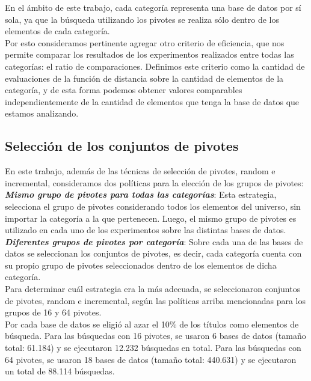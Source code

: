 En el \'ambito de este trabajo, cada categor\'ia representa una base de datos por s\'i sola, ya que la b\'usqueda utilizando los pivotes se realiza s\'olo dentro de los elementos de cada categor\'ia.\\

Por esto consideramos pertinente agregar otro criterio de eficiencia, que nos permite comparar los resultados de los experimentos realizados entre todas las categor\'ias: el ratio de comparaciones. Definimos este criterio como la cantidad de evaluaciones de la funci\'on de distancia sobre la cantidad de elementos de la categor\'ia, y de esta forma podemos obtener valores comparables independientemente de la cantidad de elementos que tenga la base de datos que estamos analizando.

\subsection{Selecci\'on de los conjuntos de pivotes}

En este trabajo, adem\'as de las t\'ecnicas de selecci\'on de pivotes, random e incremental, consideramos dos pol\'iticas para la elecci\'on de los grupos de pivotes:\\

\textit{\textbf{Mismo grupo de pivotes para todas las categor\'ias}}: Esta estrategia, selecciona el grupo de pivotes considerando todos los elementos del universo, sin importar la categor\'ia a la que pertenecen. Luego, el mismo grupo de pivotes es utilizado en cada uno de los experimentos sobre las distintas bases de datos.\\

\textit{\textbf{Diferentes grupos de pivotes por categor\'ia}}: Sobre cada una de las bases de datos se seleccionan los conjuntos de pivotes, es decir, cada categor\'ia cuenta con su propio grupo de pivotes seleccionados dentro de los elementos de dicha categor\'ia.\\

Para determinar cu\'al estrategia era la m\'as adecuada, se seleccionaron conjuntos de pivotes, random e incremental, seg\'un las pol\'iticas arriba mencionadas para los grupos de 16 y 64 pivotes.\\

Por cada base de datos se eligi\'o al azar el 10\% de los t\'itulos como elementos de b\'usqueda. Para las b\'usquedas con 16 pivotes, se usaron 6 bases de datos (tamaño total: 61.184) y se ejecutaron 12.232  b\'usquedas en total. Para las b\'usquedas con 64 pivotes, se usaron 18 bases de datos (tamaño total: 440.631) y se ejecutaron un total de 88.114 b\'usquedas.\\

